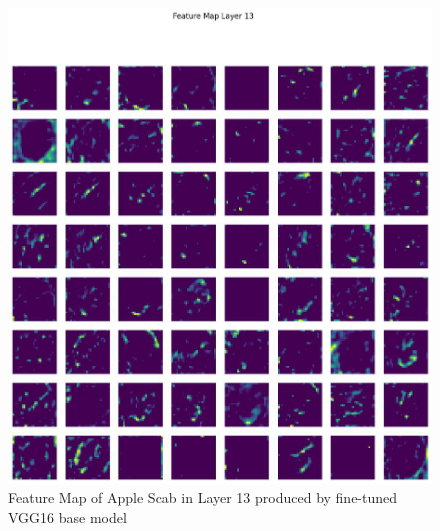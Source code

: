 \begin{figure}
    \centering
    \includegraphics[width=\linewidth]{graphics//chapter7/abr fmap 13.png}
    \caption{Feature Map of Apple Scab in Layer 13 produced by fine-tuned VGG16 base model}
    \label{fig:abr-fmap4}
\end{figure}


